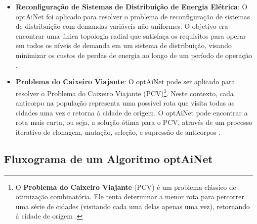 \begin{itemize}
    \item \textbf{Reconfiguração de Sistemas de Distribuição de Energia Elétrica}: O optAiNet foi aplicado para resolver o problema de reconfiguração de sistemas de distribuição com demandas variáveis não uniformes. O objetivo era encontrar uma única topologia radial que satisfaça os requisitos para operar em todos os níveis de demanda em um sistema de distribuição, visando minimizar os custos de perdas de energia ao longo de um período de operação \cite{optainet2015}.
    
    \item \textbf{Problema do Caixeiro Viajante}: O optAiNet pode ser aplicado para resolver o Problema do Caixeiro Viajante (PCV)\footnote{O \textbf{Problema do Caixeiro Viajante} (PCV) é um problema clássico de otimização combinatória. Ele tenta determinar a menor rota para percorrer uma série de cidades (visitando cada uma delas apenas uma vez), retornando à cidade de origem \cite{matufrgs2024}.}. Neste contexto, cada anticorpo na população representa uma possível rota que visita todas as cidades uma vez e retorna à cidade de origem. O optAiNet pode encontrar a rota mais curta, ou seja, a solução ótima para o PCV, através de um processo iterativo de clonagem, mutação, seleção, e supressão de anticorpos \cite{pvc2011}.
\end{itemize}

\subsection{Fluxograma de um Algoritmo optAiNet} \thispagestyle{mystyle}

